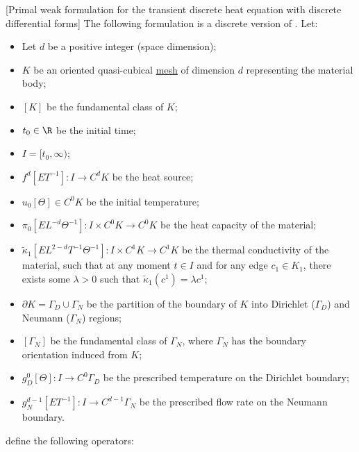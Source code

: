 \begin{formulation}
  \label{idec/diffusion/discrete/transient/primal_weak-formulation}
  [Primal weak formulation for the transient discrete heat equation
    with discrete differential forms]
  The following formulation is a discrete version of
  .
  Let:
  \begin{itemize}
    \item
      Let $d$ be a positive integer (space dimension);
    \item
      $K$ be an oriented quasi-cubical \hyperref[idec:mesh:definition]{mesh} of
      dimension $d$ representing the material body;
    \item
      $[K]$ be the fundamental class of $K$;
    \item
      $t_0 \in \R$ be the initial time;
    \item
      $I = [t_0, \infty)$;
    \item
      $f^d [E T^{-1}] \colon I \to C^d K$ be the heat source;
    \item
      $u_0 [\Theta] \in C^0 K$ be the initial temperature;
    \item
      $\pi_0 [E L^{-d} \Theta^{-1}] \colon I \times C^0 K \to C^0 K$
      be the heat capacity of the material;
    \item
      $\tilde{\kappa}_1 [E L^{2 - d} T^{-1} \Theta^{-1}]
      \colon I \times C^1 K \to C^1 K$
      be the thermal conductivity of the material, such that at any moment
      $t \in I$ and for any edge $c_1 \in K_1$, there exists some $\lambda > 0$
      such that $\tilde{\kappa}_1(c^1) = \lambda c^1$;
    \item
      $\partial K = \Gamma_D \cup \Gamma_N$ be the partition of the boundary of
      $K$ into Dirichlet ($\Gamma_D$) and Neumann ($\Gamma_N$) regions;
    \item
      $[\Gamma_N]$ be the fundamental class of $\Gamma_N$, where $\Gamma_N$
      has the boundary orientation induced from $K$;
    \item
      $g_D^0 [\Theta] \colon I \to C^0 \Gamma_D$
      be the prescribed temperature on the Dirichlet boundary;
    \item
      $g_N^{d - 1} [E T^{-1}] \colon I \to C^{d - 1} \Gamma_N$
      be the prescribed flow rate on the Neumann boundary.
  \end{itemize}
  define the following operators:
  \begin{subequations}
    \begin{alignat}{3}

\end{alignat}
\end{subequations}
\end{formulation}

